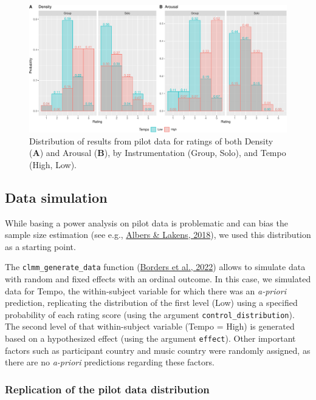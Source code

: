 \documentclass[
  bookmarksnumbered]{article}
\begin{document}
\begin{figure}
\centering
\includegraphics{Power_analysis_files/figure-latex/unnamed-chunk-7-1.pdf}
\caption{\label{fig:unnamed-chunk-7}Distribution of results from pilot data for ratings of both Density (\textbf{A}) and Arousal (\textbf{B}), by Instrumentation (Group, Solo), and Tempo (High, Low).}
\end{figure}

\hypertarget{data-simulation}{%
\subsection{Data simulation}\label{data-simulation}}

While basing a power analysis on pilot data is problematic and can bias the sample size estimation (see e.g., \protect\hyperlink{ref-albersWhenPowerAnalyses2018}{Albers \& Lakens, 2018}), we used this distribution as a starting point.

The \texttt{clmm\_generate\_data} function (\protect\hyperlink{ref-bordersPowerAnalysisOrdinal2022}{Borders et al., 2022}) allows to simulate data with random and fixed effects with an ordinal outcome. In this case, we simulated data for Tempo, the within-subject variable for which there was an \emph{a-priori} prediction, replicating the distribution of the first level (Low) using a specified probability of each rating score (using the argument \texttt{control\_distribution}). The second level of that within-subject variable (Tempo = High) is generated based on a hypothesized effect (using the argument \texttt{effect}). Other important factors such as participant country and music country were randomly assigned, as there are no \emph{a-priori} predictions regarding these factors.

\hypertarget{replication-of-the-pilot-data-distribution}{%
\subsubsection{Replication of the pilot data distribution}\label{replication-of-the-pilot-data-distribution}}
\end{document}
